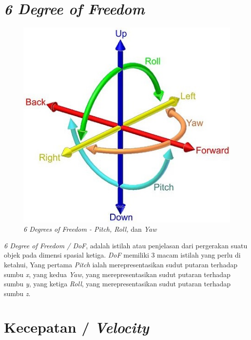 \section{\textit{6 Degree of Freedom}}
\vspace{1ex}

\begin{figure}  [!htb]
	        \captionsetup{justification=centering}
	        \includegraphics[scale=0.4]{img/6dof.jpg}
	        \caption{\textit{6 Degrees of Freedom - Pitch, Roll,} dan \textit{Yaw}\cite{cit:15}}
	        \label{fig: 3_18}
\end{figure}

\textit{6 Degree of Freedom / DoF}, adalah istilah atau penjelasan dari pergerakan suatu objek pada dimensi spasial ketiga. \textit{DoF} memiliki 3 macam istilah yang perlu di ketahui, Yang pertama \textit{Pitch} ialah merepresentasikan sudut putaran terhadap sumbu \textit{x}, yang kedua \textit{Yaw}, yang merepresentasikan sudut putaran terhadap sumbu \textit{y}, yang ketiga \textit{Roll}, yang merepresentasikan sudut putaran terhadap sumbu \textit{z}.

\section{Kecepatan / \textit{Velocity}}
\vspace{1ex}


